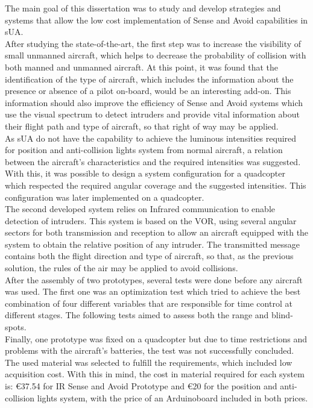 The main goal of this dissertation was to study and develop strategies and systems that allow the low cost implementation of Sense and Avoid capabilities in sUA.\\
After studying the state-of-the-art, the first step was to increase the visibility of small unmanned aircraft, which helps to decrease the probability of collision with both manned and unmanned aircraft. At this point, it was found that the identification of the type of aircraft, which includes the information about the presence or absence of a pilot on-board, would be an interesting add-on. This information should also improve the efficiency of Sense and Avoid systems which use the visual spectrum to detect intruders and provide vital information about their flight path and type of aircraft, so that right of way may be applied.\\
As sUA do not have the capability to achieve the luminous intensities required for position and anti-collision lights system from normal aircraft, a relation between the aircraft's characteristics and the required intensities was suggested. With this, it was possible to design a system configuration for a quadcopter which respected the required angular coverage and the suggested intensities. This configuration was later implemented on a quadcopter.\\
The second developed system relies on Infrared communication to enable detection of intruders. This system is based on the VOR, using several angular sectors for both transmission and reception to allow an aircraft equipped with the system to obtain the relative position of any intruder. The transmitted message contains both the flight direction and type of aircraft, so that, as the previous solution, the rules of the air may be applied to avoid collisions.\\
After the assembly of two prototypes, several tests were done before any aircraft was used. The first one was an optimization test which tried to achieve the best combination of four different variables that are responsible for time control at different stages. The following tests aimed to assess both the range and blind-spots.\\
Finally, one prototype was fixed on a quadcopter but due to time restrictions and problems with the aircraft's batteries, the test was not successfully concluded.\\
The used material was selected to fulfill the requirements, which included low acquisition cost. With this in mind, the cost in material required for each system is: \euro{37.54} for IR Sense and Avoid Prototype and \euro{20} for the position and anti-collision lights system, with the price of an Arduino\texttrademark board included in both prices.\\


